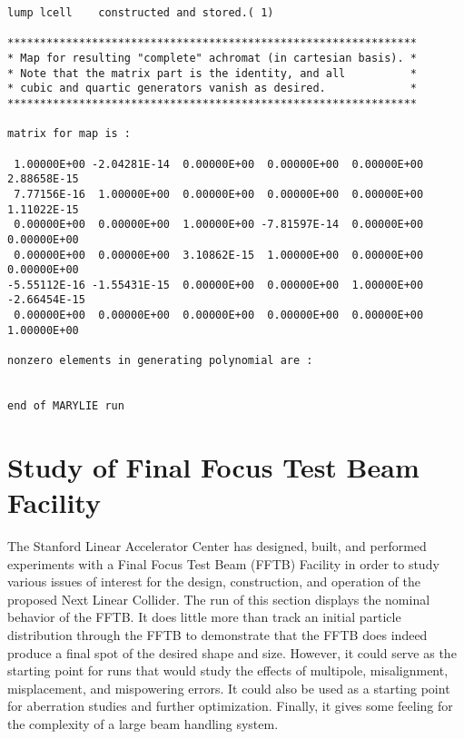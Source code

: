 \begin{footnotesize}
\begin{verbatim}
lump lcell    constructed and stored.( 1)

***************************************************************
* Map for resulting "complete" achromat (in cartesian basis). *
* Note that the matrix part is the identity, and all          *
* cubic and quartic generators vanish as desired.             *
***************************************************************

matrix for map is :

 1.00000E+00 -2.04281E-14  0.00000E+00  0.00000E+00  0.00000E+00  2.88658E-15
 7.77156E-16  1.00000E+00  0.00000E+00  0.00000E+00  0.00000E+00  1.11022E-15
 0.00000E+00  0.00000E+00  1.00000E+00 -7.81597E-14  0.00000E+00  0.00000E+00
 0.00000E+00  0.00000E+00  3.10862E-15  1.00000E+00  0.00000E+00  0.00000E+00
-5.55112E-16 -1.55431E-15  0.00000E+00  0.00000E+00  1.00000E+00 -2.66454E-15
 0.00000E+00  0.00000E+00  0.00000E+00  0.00000E+00  0.00000E+00  1.00000E+00

nonzero elements in generating polynomial are :


end of MARYLIE run
\end{verbatim}
\end{footnotesize}

\section{Study of Final Focus Test Beam Facility} 
\label{testbeam}
The Stanford Linear Accelerator Center has designed, built, and performed
experiments with a Final Focus Test Beam (FFTB) Facility in order to
study various issues of interest for the design, construction, and
operation of the proposed Next Linear Collider.  The \Mary run of this
section displays the nominal behavior of the FFTB.  It does little more
than track an initial particle distribution through the FFTB to
demonstrate that the FFTB does indeed produce a final spot of the desired shape
and size.  However, it could serve as the starting point for runs that
would study the effects of multipole, misalignment, misplacement, and
mispowering errors.  It could also be used as a starting point for aberration
studies and further optimization.  Finally, it gives some feeling for the
complexity of a large beam handling system. 

